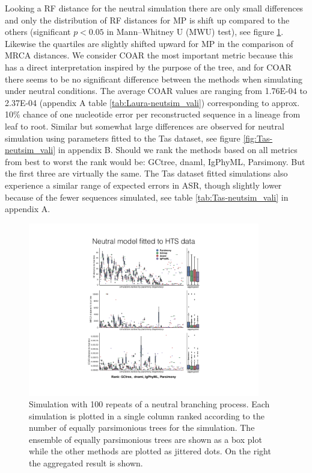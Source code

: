 Looking a RF distance for the neutral simulation there are only small differences and only the distribution of RF distances for MP is shift up compared to the others (significant $p<0.05$ in Mann–Whitney U (MWU) test), see figure \ref{fig:Laura-neutsim_valid}.
Likewise the quartiles are slightly shifted upward for MP in the comparison of MRCA distances.
We consider COAR the most important metric because this has a direct interpretation inspired by the purpose of the tree, and for COAR there seems to be no significant difference between the methods when simulating under neutral conditions.
The average COAR values are ranging from 1.76E-04 to 2.37E-04 (appendix A table \ref{tab:Laura-neutsim_vali}) corresponding to approx. 10\% chance of one nucleotide error per reconstructed sequence in a lineage from leaf to root.
Similar but somewhat large differences are observed for neutral simulation using parameters fitted to the Tas dataset, see figure \ref{fig:Tas-neutsim_vali} in appendix B.
Should we rank the methods based on all metrics from best to worst the rank would be: GCtree, dnaml, IgPhyML, Parsimony.
But the first three are virtually the same.
The Tas dataset fitted simulations also experience a similar range of expected errors in ASR, though slightly lower because of the fewer sequences simulated, see table \ref{tab:Tas-neutsim_vali} in appendix A.

\begin{figure}[!ht]
    \centering
    \includegraphics[width=0.9\textwidth]{figures/Laura-neutsim_valid.pdf}
    \caption{
        \label{fig:Laura-neutsim_valid}
        Simulation with 100 repeats of a neutral branching process.
        Each simulation is plotted in a single column ranked according to the number of equally parsimonious trees for the simulation.
        The ensemble of equally parsimonious trees are shown as a box plot while the other methods are plotted as jittered dots.
        On the right the aggregated result is shown.
    }
\end{figure}
\clearpage


